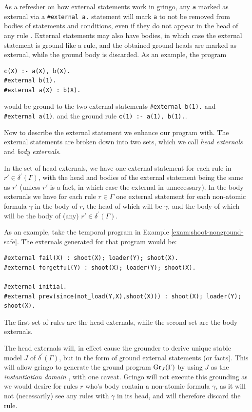 As a refresher on how external statements work in gringo, any \verb|a|
marked as external via a \verb|#external a.| statement will mark
\verb|a| to not be removed from bodies of statements and conditions,
even if they do not appear in the head of any rule
\cite{PotasscoUserGuide19}. External statements may also have bodies,
in which case the external statement is ground like a rule, and the
obtained ground heads are marked as external, while the ground body is
discarded. As an example, the program
\begin{lstlisting}[language=clingo]
c(X) :- a(X), b(X).
#external b(1).
#external a(X) : b(X).
\end{lstlisting}
would be ground to the two external statements \verb|#external b(1).|
and \\\verb|#external a(1)|. and the ground rule
\verb|c(1) :- a(1), b(1).|.

Now to describe the external statement we enhance our program
with. The external statements are broken down into two sets, which we
call \emph{head externals} and \emph{body externals}.

In the set of head externals, we have one external statement for each
rule in $r' \in \delta^\prime(\Gamma)$, with the head and bodies of
the external statement being the same as $r'$ (unless $r'$ is a fact,
in which case the external in unnecessary). In the body externals we
have for each rule $r \in \Gamma$ one external statement for each
non-atomic formula $\gamma$ in the body of $r$, the head of which will
be $\gamma$, and the body of which will be the body of (any)
$r' \in \delta^\prime(\Gamma)$.


\begin{example}
  As an example, take the temporal program in Example
  \ref{exam:shoot-nonground-safe}. The externals generated for that program would be:
\begin{lstlisting}[numbers=none]
#external fail(X) : shoot(X); loader(Y); shoot(X).
#external forgetful(Y) : shoot(X); loader(Y); shoot(X).

#external initial.
#external prev(since(not_load(Y,X),shoot(X))) : shoot(X); loader(Y); shoot(X).
  \end{lstlisting}
  The first set of rules are the head externals, while the second set
  are the body externals.
\end{example}

The head externals will, in effect cause the grounder to derive unique
stable model $J$ of $\delta^\prime(\Gamma)$, but in the form of ground
external statements (or facts). This will allow gringo to generate the
ground program $\operatorname{Gr}_{J}(\Gamma)$ by using $J$ as the
\emph{instantiation domain} \cite[p. 82]{gekakasc12a}, with one
caveat. Gringo will not execute this grounding as we would desire for
rules $r$ who's body contain a non-atomic formula $\gamma$, as it will
not (necessarily) see any rules with $\gamma$ in its head, and will
therefore discard the rule.

